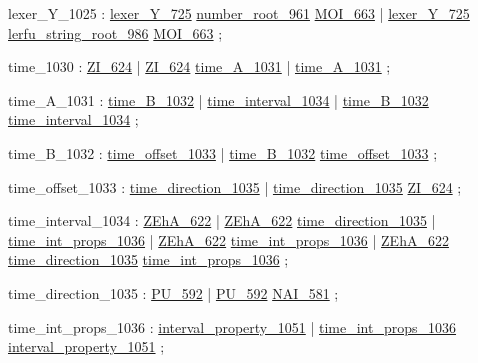 \label{html:y1025}
lexer_Y_1025            :  \hyperref[html:y725]{lexer_Y_725}  \hyperref[html:y961]{number_root_961}  \hyperref[html:y663]{MOI_663}
                        |  \hyperref[html:y725]{lexer_Y_725}  \hyperref[html:y986]{lerfu_string_root_986}  \hyperref[html:y663]{MOI_663}
                        ;

\label{html:y1030}
time_1030               :  \hyperref[html:y624]{ZI_624}
                        |  \hyperref[html:y624]{ZI_624}  \hyperref[html:y1031]{time_A_1031}
                        |  \hyperref[html:y1031]{time_A_1031}
                        ;

\label{html:y1031}
time_A_1031             :  \hyperref[html:y1032]{time_B_1032}
                        |  \hyperref[html:y1034]{time_interval_1034}
                        |  \hyperref[html:y1032]{time_B_1032}  \hyperref[html:y1034]{time_interval_1034}
                        ;

\label{html:y1032}
time_B_1032             :  \hyperref[html:y1033]{time_offset_1033}
                        |  \hyperref[html:y1032]{time_B_1032}  \hyperref[html:y1033]{time_offset_1033}
                        ;

\label{html:y1033}
time_offset_1033        :  \hyperref[html:y1035]{time_direction_1035}
                        |  \hyperref[html:y1035]{time_direction_1035}  \hyperref[html:y624]{ZI_624}
                        ;

\label{html:y1034}
time_interval_1034      :  \hyperref[html:y622]{ZEhA_622}
                        |  \hyperref[html:y622]{ZEhA_622}  \hyperref[html:y1035]{time_direction_1035}
                        |  \hyperref[html:y1036]{time_int_props_1036}
                        |  \hyperref[html:y622]{ZEhA_622}  \hyperref[html:y1036]{time_int_props_1036}
                        |  \hyperref[html:y622]{ZEhA_622}  \hyperref[html:y1035]{time_direction_1035}  \hyperref[html:y1036]{time_int_props_1036}
                        ;

\label{html:y1035}
time_direction_1035     :  \hyperref[html:y592]{PU_592}
                        |  \hyperref[html:y592]{PU_592}  \hyperref[html:y581]{NAI_581}
                        ;

\label{html:y1036}
time_int_props_1036     :  \hyperref[html:y1051]{interval_property_1051}
                        |  \hyperref[html:y1036]{time_int_props_1036}  \hyperref[html:y1051]{interval_property_1051}
                        ;

